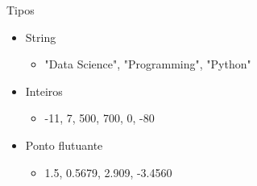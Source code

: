 
\begin{frame}[t,plain]
\titlepage
\end{frame}

\begin{frame}[t, fragile]{Tipos}
  \begin{itemize}
    \item String
    \begin{itemize}
      \item "Data Science", "Programming", "Python"
    \end{itemize}
    \item Inteiros
    \begin{itemize}
      \item -11, 7, 500, 700, 0, -80
    \end{itemize}
    \item Ponto flutuante
    \begin{itemize}
      \item 1.5, 0.5679, 2.909, -3.4560
    \end{itemize}
  \end{itemize}
\end{frame}

 